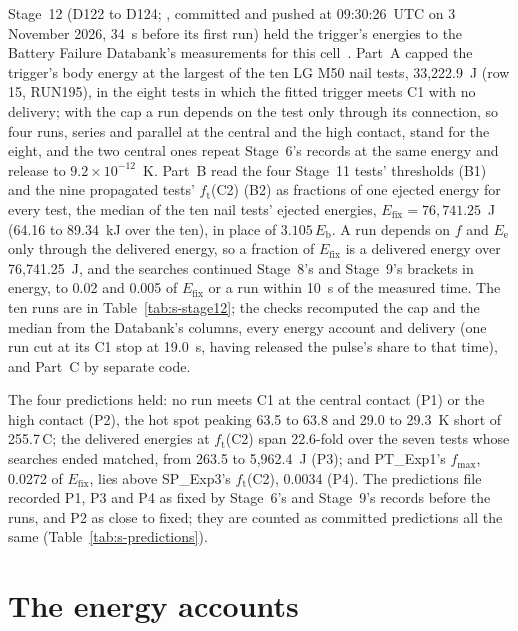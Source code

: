 \documentclass[preprint,12pt]{elsarticle}
\newcommand{\degC}{\,\textdegree C}
\newcommand{\ft}{f_{\mathrm{t}}}
\newcommand{\fmax}{f_{\mathrm{max}}}
\newcommand{\Eb}{E_{\mathrm{b}}}
\newcommand{\Ee}{E_{\mathrm{e}}}
\begin{document}
Stage~12 (D122 to D124; , committed and pushed at 09:30:26~UTC on 3 November 2026, 34~s before its first run) held the trigger's energies to the Battery Failure Databank's measurements for this cell~\cite{finegan2024databank}. Part~A capped the trigger's body energy at the largest of the ten LG M50 nail tests, 33,222.9~J (row 15, RUN195), in the eight tests in which the fitted trigger meets C1 with no delivery; with the cap a run depends on the test only through its connection, so four runs, series and parallel at the central and the high contact, stand for the eight, and the two central ones repeat Stage~6's records at the same energy and release to $9.2\times10^{-12}$~K. Part~B read the four Stage~11 tests' thresholds (B1) and the nine propagated tests' $\ft$(C2) (B2) as fractions of one ejected energy for every test, the median of the ten nail tests' ejected energies, $E_\mathrm{fix}=76{,}741.25$~J (64.16 to 89.34~kJ over the ten), in place of $3.105\,\Eb$. A run depends on $f$ and $\Ee$ only through the delivered energy, so a fraction of $E_\mathrm{fix}$ is a delivered energy over 76,741.25~J, and the searches continued Stage~8's and Stage~9's brackets in energy, to 0.02 and 0.005 of $E_\mathrm{fix}$ or a run within 10~s of the measured time. The ten runs are in Table~\ref{tab:s-stage12}; the checks recomputed the cap and the median from the Databank's columns, every energy account and delivery (one run cut at its C1 stop at 19.0~s, having released the pulse's share to that time), and Part~C by separate code.

The four predictions held: no run meets C1 at the central contact (P1) or the high contact (P2), the hot spot peaking 63.5 to 63.8 and 29.0 to 29.3~K short of 255.7\degC; the delivered energies at $\ft$(C2) span 22.6-fold over the seven tests whose searches ended matched, from 263.5 to 5,962.4~J (P3); and PT\_Exp1's $\fmax$, 0.0272 of $E_\mathrm{fix}$, lies above SP\_Exp3's $\ft$(C2), 0.0034 (P4). The predictions file recorded P1, P3 and P4 as fixed by Stage~6's and Stage~9's records before the runs, and P2 as close to fixed; they are counted as committed predictions all the same (Table~\ref{tab:s-predictions}).


\section{The energy accounts}
\label{sec:s-energy}
\end{document}

